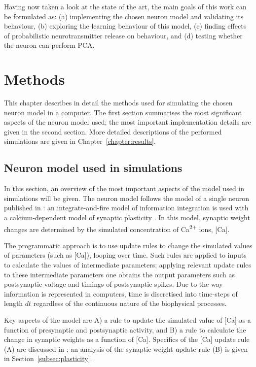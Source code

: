 \documentclass[a4paper,12pt]{report}
\theoremstyle{definition}
\begin{document}
Having now taken a look at the state of the art, the main goals of this work can be formulated as:
(a) implementing the chosen neuron model and validating its behaviour,
(b) exploring the learning behaviour of this model,
(c) finding effects of probabilistic neurotransmitter release on behaviour, and
(d) testing whether the neuron can perform PCA.




\chapter{Methods}

This chapter describes in detail the methods used for simulating the chosen neuron model in a computer. The first section summarises the most significant aspects of the neuron model used; the most important implementation details are given in the second section.
More detailed descriptions of the performed simulations are given in Chapter~\ref{chapter:results}.

\section{Neuron model used in simulations}
\label{methods-modelused}

In this section, an overview of the most important aspects of the model used in simulations will be given. The neuron model follows the model of a single neuron published in \cite{yeung2004synaptic}: an integrate-and-fire model of information integration is used with a calcium-dependent model of synaptic plasticity \cite{shouval2002unified}. In this model, synaptic weight changes are determined by the simulated concentration of Ca\textsuperscript{2+} ions, [Ca].

The programmatic approach is to use update rules to change the simulated values of parameters (such as [Ca]), looping over time. Such rules are applied to inputs to calculate the values of intermediate parameters; applying relevant update rules to these intermediate parameters one obtains the output parameters such as postsynaptic voltage and timings of postsynaptic spikes. Due to the way information is represented in computers, time is discretised into time-steps of length $dt$ regardless of the continuous nature of the biophysical processes.  

Key aspects of the model are A) a rule to update the simulated value of [Ca] as a function of presynaptic and postsynaptic activity, and B) a rule to calculate the change in synaptic weights as a function of [Ca]. Specifics of the [Ca] update rule (A) are discussed in \cite{shouval2002unified}; an analysis of the synaptic weight update rule (B) is given in Section~\ref{subsec:plasticity}.
\end{document}
